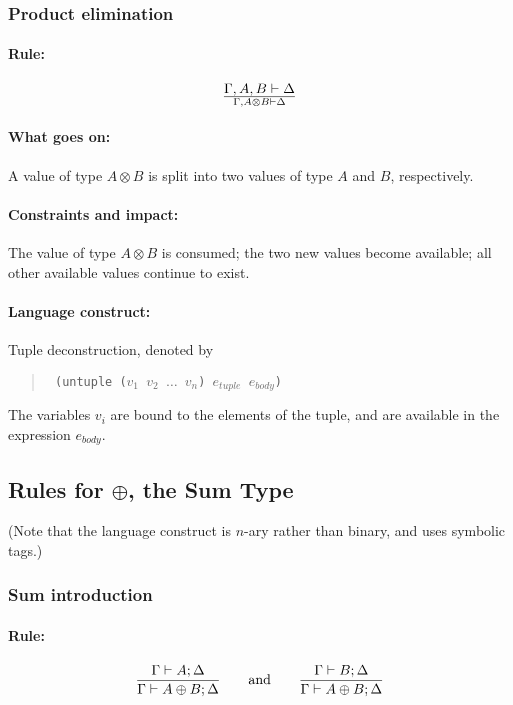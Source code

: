 \documentclass[a4paper]{article}
\begin{document}
\subsubsection{Product elimination}
\paragraph{Rule:}
$$
{
  \Gamma, A, B \vdash \Delta
}\over{
  \Gamma, A\otimes B \vdash \Delta
}
$$

\paragraph{What goes on:} A value of type $A \otimes B$ is split into two values of type $A$ and $B$, respectively.

\paragraph{Constraints and impact:} The value of type $A \otimes B$ is consumed; the two new values become available; all other available values continue to exist.

\paragraph{Language construct:} Tuple deconstruction, denoted by
\begin{quote}\tt
  (untuple ($v_1$ $v_2$ $\ldots$ $v_n$) $e_{tuple}$ $e_{body}$)
\end{quote}
The variables $v_i$ are bound to the elements of the tuple, and are available in the expression $e_{body}$.



\subsection{Rules for $\oplus$, the Sum Type}

(Note that the language construct is $n$-ary rather than binary, and
uses symbolic tags.)


\subsubsection{Sum introduction}
\paragraph{Rule:}
$$
{{
  \Gamma \vdash A;\Delta
}\over{
  \Gamma \vdash A \oplus B;\Delta
}}
\qquad \textrm{and} \qquad
{{
  \Gamma \vdash B;\Delta
}\over{
  \Gamma \vdash A \oplus B;\Delta
}}
$$
\end{document}
